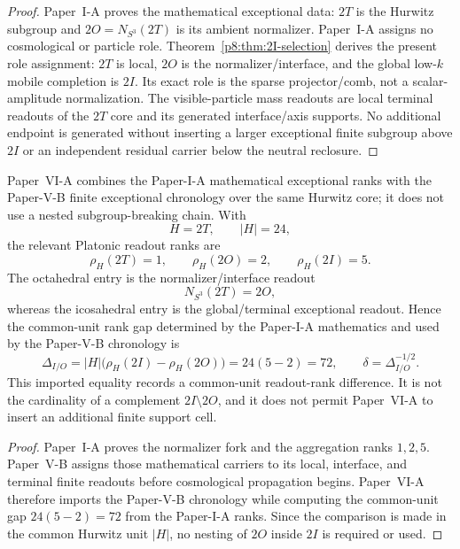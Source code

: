 \documentclass[12pt,a4paper]{article}
\begin{document}
\begin{proof}
Paper~I-A proves the mathematical exceptional data: \(2T\) is the Hurwitz
subgroup and \(2O=N_{S^3}(2T)\) is its ambient normalizer.  Paper~I-A assigns
no cosmological or particle role.  Theorem~\ref{p8:thm:2I-selection}
derives the present role assignment: \(2T\) is local, \(2O\) is the
normalizer/interface, and the global low-\(k\) mobile completion is \(2I\).
Its exact role is the sparse projector/comb, not a scalar-amplitude
normalization.  The
visible-particle mass readouts are local terminal readouts of the \(2T\) core
and its generated interface/axis supports.  No additional endpoint is generated
without inserting a larger exceptional finite subgroup above \(2I\) or an
independent residual carrier below the neutral reclosure.
\end{proof}


\begin{corollary}
\label{p8:cor:paper-vi-platonic-readout-rank-handoff}
Paper~VI-A combines the Paper-I-A mathematical exceptional ranks with the Paper-V-B finite exceptional chronology over the same Hurwitz core; it does not use a nested subgroup-breaking chain.  With
\begin{equation}
\label{p8:eq:paper-vi-hurwitz-core-import}
    H=2T,
    \qquad |H|=24,
\end{equation}
the relevant Platonic readout ranks are
\begin{equation}
\label{p8:eq:paper-vi-readout-ranks-imported}
    \rho_H(2T)=1,
    \qquad
    \rho_H(2O)=2,
    \qquad
    \rho_H(2I)=5.
\end{equation}
The octahedral entry is the normalizer/interface readout
\begin{equation}
\label{p8:eq:paper-vi-normalizer-imported}
    N_{S^3}(2T)=2O,
\end{equation}
whereas the icosahedral entry is the global/terminal exceptional readout.  Hence
the common-unit rank gap determined by the Paper-I-A mathematics and used by the Paper-V-B chronology is
\begin{equation}
\label{p8:eq:paper-vi-readout-gap-imported}
    \Delta_{I/O}=|H|\bigl(\rho_H(2I)-\rho_H(2O)\bigr)=24(5-2)=72,
    \qquad
    \delta=\Delta_{I/O}^{-1/2}.
\end{equation}
This imported equality records a common-unit readout-rank difference.  It is not
the cardinality of a complement \(2I\setminus2O\), and it does not permit Paper~VI-A
to insert an additional finite support cell.
\end{corollary}
\begin{proof}
Paper~I-A proves the normalizer fork and the aggregation ranks \(1,2,5\).  Paper~V-B assigns those mathematical carriers to its local, interface, and terminal finite readouts before cosmological propagation begins.  Paper~VI-A therefore imports the Paper-V-B chronology while computing the common-unit gap \(24(5-2)=72\) from the Paper-I-A ranks.  Since the comparison is made in the common Hurwitz unit \(|H|\),
no nesting of \(2O\) inside \(2I\) is required or used.\qedhere
\end{proof}
\end{document}
